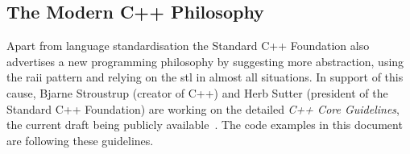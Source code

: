 \subsection{The Modern C++ Philosophy}\label{intro:philosophy}

Apart from language standardisation the Standard C++ Foundation also advertises a new programming philosophy by suggesting more abstraction, using the \gls{raii} pattern and relying on the \gls{stl} in almost all situations. In support of this cause, Bjarne Stroustrup (creator of C++) and Herb Sutter (president of the Standard C++ Foundation) are working on the detailed \textit{C++ Core Guidelines}, the current draft being publicly available~\cite{cpp_guidelines}. The code examples in this document are following these guidelines.